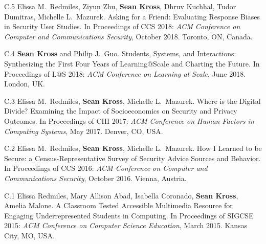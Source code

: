 \begin{bibenum}
\item[C.5] Elissa M.\ Redmiles, Ziyun Zhu, \textbf{Sean Kross}, Dhruv Kuchhal,
Tudor Dumitras, Michelle L.\ Mazurek. Asking for a Friend: Evaluating Response 
Biases in Security User Studies. In Proceedings of CCS 2018: \emph{ACM 
Conference on Computer and Communications Security}, October 2018. Toronto, ON, 
Canada.

\item[C.4] \textbf{Sean Kross} and Philip J.\ Guo. Students, Systems,
and Interactions: Synthesizing the First Four Years of Learning@Scale
and Charting the Future. In Proceedings of L@S 2018: \emph{ACM
Conference on Learning at Scale}, June 2018. London, UK.

\item[C.3] Elissa M.\ Redmiles, \textbf{Sean Kross}, Michelle L.\ Mazurek. 
Where is the Digital Divide? Examining the Impact of Socioeconomics on Security 
and Privacy Outcomes. In Proceedings of CHI 2017: \emph{ACM Conference on 
Human Factors in Computing Systems}, May 2017. Denver, CO, USA.

\item[C.2] Elissa M.\ Redmiles, \textbf{Sean Kross}, Michelle L.\ Mazurek. How 
I Learned to be Secure: a Census-Representative Survey of Security Advice 
Sources and Behavior. In Proceedings of CCS 2016: \emph{ACM Conference on 
Computer and Communications Security}, October 2016. Vienna, Austria.

\item[C.1] Elissa Redmiles, Mary Allison Abad, Isabella Coronado, 
\textbf{Sean Kross}, Amelia Malone. A Classroom Tested Accessible Multimedia 
Resource for Engaging Underrepresented Students in Computing. In Proceedings of
SIGCSE 2015: \emph{ACM Conference on Computer Science Education}, March 2015. 
Kansas City, MO, USA.

\end{bibenum}

\vspace{0.1in}




